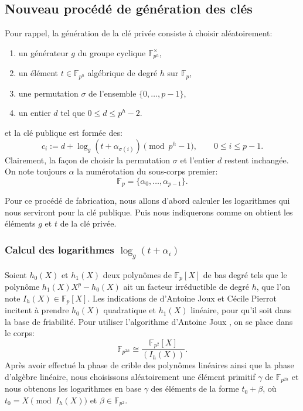 \documentclass[a4paper, titlepage, 11pt]{article}
\theoremstyle{definition}
\theoremstyle{remark}
\def\gf #1{\mathbb{F}_{#1}}
\begin{document}
\subsection{Nouveau procédé de génération des clés}

Pour rappel, la génération de la clé privée consiste à choisir aléatoirement:
\begin{enumerate}
\item un générateur $g$ du groupe cyclique $\gf{p^h}^\times$,
\item un élément $t \in \gf{p^h}$ algébrique de degré $h$ sur $\gf{p}$,
\item une permutation $\sigma$ de l'ensemble $\{0, \dots, p-1\}$,
\item un entier $d$ tel que $0 \leqslant d \leqslant p^h-2$.
\end{enumerate}
et la clé publique est formée des:
$$c_i := d + \log_g\left(t + \alpha_{\sigma(i)}\right) \pmod{p^h-1}, \qquad 0 \leqslant i \leqslant p-1.$$
Clairement, la façon de choisir la permutation $\sigma$ et l'entier $d$ restent inchangée. On note toujours $\alpha$ la numérotation du sous-corps premier: $$\gf{p} = \{\alpha_0, \dots, \alpha_{p-1}\}.$$

Pour ce procédé de fabrication, nous allons d'abord calculer les logarithmes qui nous serviront pour la clé publique. Puis nous indiquerons comme on obtient les éléments $g$ et $t$ de la clé privée.

\subsubsection{Calcul des logarithmes $\log_g\left(t + \alpha_{i}\right)$}

Soient $h_0(X)$ et $h_1(X)$ deux polynômes de $\gf{p}[X]$ de bas degré tels que le polynôme $h_1(X)X^p-h_0(X)$ ait un facteur irréductible de degré $h$, que l'on note $I_h(X) \in \gf{p}[X]$. Les indications de d'Antoine Joux \cite{joux2013} et Cécile Pierrot \cite{pierrot2016} incitent à prendre $h_0(X)$ quadratique et $h_1(X)$ linéaire, pour qu'il soit dans la base de friabilité. Pour utiliser l'algorithme d'Antoine Joux \cite{joux2013}, on se place dans le corps:
$$\gf{p^{2h}} \cong \frac{\gf{p^2}[X]}{(I_h(X))}.$$
Après avoir effectué la phase de crible des polynômes linéaires ainsi que la phase d'algèbre linéaire, nous choisissons aléatoirement une élément primitif $\gamma$ de $\gf{p^{2h}}$ et nous obtenons les logarithmes en base $\gamma$ des éléments de la forme ${t_0} + \beta$, où ${t_0} = X \pmod{I_h(X)}$ et $\beta \in \gf{p^2}$. 
\end{document}
